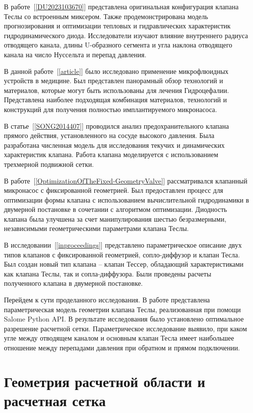 \documentclass[10pt,a4paper]{book}
\begin{document}
    В работе~[\ref{DU2023103670}] представлена оригинальная конфигурация клапана Теслы со встроенным миксером. Также продемонстрирована модель прогнозирования и оптимизации тепловых и гидравлических характеристик гидродинамического диода. Исследователи изучают влияние внутреннего радиуса отводящего канала, длины U-образного сегмента и угла наклона отводящего канала на число Нуссельта и перепад давления.
    
    В данной работе~[\ref{article}] было исследовано применение микрофлюидных устройств в медицине. Был представлен панорамный обзор технологий и материалов, которые могут быть использованы для лечения Гидроцефалии. Представлена наиболее подходящая комбинация материалов, технологий и конструкций для получения полностью имплантируемого микронасоса. 
    
    В статье~[\ref{SONG2014407}] проводился анализ предохранительного клапана прямого действия, установленного на сосуде высокого давления. Была разработана численная модель для исследования текучих и динамических характеристик клапана. Работа клапана моделируется с использованием трехмерной подвижной сетки.
    
    В работе~[\ref{OptimizationOfTheFixed-GeometryValve}] рассматривался клапанный микронасос с фиксированной геометрией. Был предоставлен процесс для оптимизации формы клапана с использованием вычислительной гидродинамики в двумерной постановке в сочетании с алгоритмом оптимизации. Диодность клапана была улучшена за счет манипулирования шестью безразмерными, независимыми геометрическими параметрами клапана Теслы.
    
    В исследовании~[\ref{inproceedings}] представлено параметрическое описание двух типов клапанов с фиксированной геометрией, сопло-диффузор и клапан Тесла. Был создан новый тип клапана -- клапан Тессер, обладающий характеристиками как клапана Теслы, так и сопла-диффузора. Были проведены расчеты полученного клапана в двумерной постановке. 
    
    Перейдем к сути проделанного исследования. В работе представлена параметрическая модель геометрии клапана Теслы, реализованная при помощи Salome Python API. В результате исследования было установлено оптимальное разрешение расчетной сетки. Параметрическое исследование выявило, при каком угле между отводящем каналом и основным клапан Тесла имеет наибольшее отношение между перепадами давления при обратном и прямом подключении.
    
    \section{Геометрия расчетной области и расчетная сетка}\label{p:roles}
    
\end{document}
